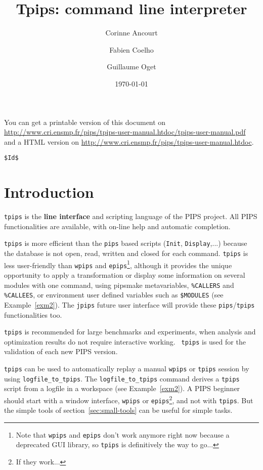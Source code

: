 \documentclass[a4paper,12pt]{article}
\title{Tpips: command line interpreter}
\author{Corinne Ancourt \and Fabien Coelho \and Guillaume Oget}
\date{\today}
\newcommand{\PipsTpipsPDF}{\url{http://www.cri.ensmp.fr/pips/tpips-user-manual.htdoc/tpips-user-manual.pdf}\xspace}
\newcommand{\PipsTpipsHTDOC}{\url{http://www.cri.ensmp.fr/pips/tpips-user-manual.htdoc}\xspace}
\begin{document}
\setlength{\parindent}{0in}

\maketitle

You can get a printable version of this document on\\
\PipsTpipsPDF and a HTML version on \PipsTpipsHTDOC.

\verb|$Id$|

\tableofcontents

\section{Introduction}


{\tt tpips} is the {\bf line interface} and scripting language of the
PIPS project. All PIPS functionalities are available, with
on-line help and automatic completion.

{\tt tpips} is more efficient than the \texttt{pips} based scripts
(\texttt{Init}, \texttt{Display},...) because the database is not open,
read, written and closed for each command. {\tt tpips} is less
user-friendly than \texttt{wpips} and \texttt{epips}\footnote{Note that
  \texttt{wpips} and \texttt{epips} don't work anymore right now because a
  deprecated GUI library, so \texttt{tpips} is definitively the way to
  go...}, although it provides the unique opportunity to apply a
transformation or display some information on several modules with one
command, using pipsmake metavariables, \verb+%CALLERS+ and
\verb+%CALLEES+,
or environment user defined variables such as \verb+$MODULES+ %
(see Example~\ref{exm2}). The \texttt{jpips} future user interface will
provide these \texttt{pips}/\texttt{tpips} functionalities too.

{\tt tpips} is recommended for large benchmarks and experiments, when
analysis and optimization results do not require interactive working. {\tt
  tpips} is used for the validation of each new PIPS version.

{\tt tpips} can be used to automatically replay a manual \texttt{wpips} or
{\tt tpips} session by using \verb+logfile_to_tpips+. The
\verb+logfile_to_tpips+ command derives a {\tt tpips} script from a
logfile in a workspace (see Example~\ref{exm2}). A PIPS beginner should
start with a window interface, \texttt{wpips} or
\texttt{epips}\footnote{If they work...}, and not with \texttt{tpips}. But
the simple tools of section~\ref{sec:small-tools} can be useful for simple
tasks.
\end{document}
